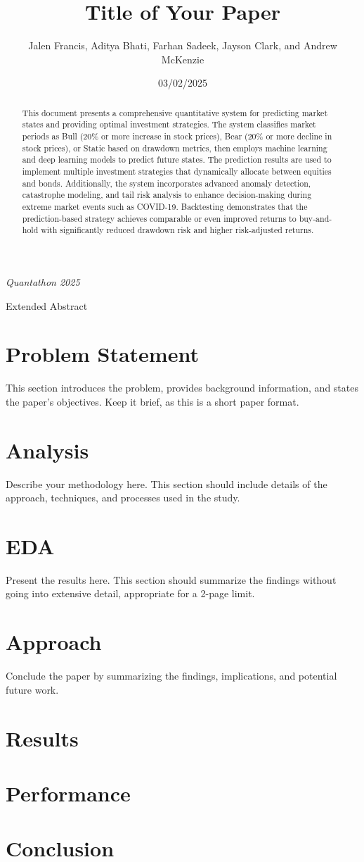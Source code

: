 \documentclass[10pt]{article}
\title{Title of Your Paper}
\author{Jalen Francis, Aditya Bhati, Farhan Sadeek, Jayson Clark, and Andrew McKenzie}
\date{03/02/2025}
\makeatletter
\renewcommand{\maketitle}{%
    \begin{center}
        \vspace*{0.5cm}
        \Large\@title
        
        \vspace{0.4cm}
        \large\@author
        
        \vspace{0.5cm}
        \normalsize\textit{Quantathon 2025}
        
        \vspace{0.3cm}
        \normalsize Extended Abstract
        \vspace{0.5cm}
    \end{center}
}
\makeatother
\begin{document}
\maketitle

\begin{abstract}

    This document presents a comprehensive quantitative system for predicting market states and providing optimal investment strategies. The system classifies market periods as Bull (20\% or more increase in stock prices), Bear (20\% or more decline in stock prices), or Static based on drawdown metrics, then employs machine learning and deep learning models to predict future states. The prediction results are used to implement multiple investment strategies that dynamically allocate between equities and bonds. Additionally, the system incorporates advanced anomaly detection, catastrophe modeling, and tail risk analysis to enhance decision-making during extreme market events such as COVID-19. Backtesting demonstrates that the prediction-based strategy achieves comparable or even improved returns to buy-and-hold with significantly reduced drawdown risk and higher risk-adjusted returns.

\end{abstract}

\section{Problem Statement}
This section introduces the problem, provides background information, and states the paper's objectives. Keep it brief, as this is a short paper format.

\section{Analysis}
Describe your methodology here. This section should include details of the approach, techniques, and processes used in the study.

\section{EDA}
Present the results here. This section should summarize the findings without going into extensive detail, appropriate for a 2-page limit.

\section{Approach}
Conclude the paper by summarizing the findings, implications, and potential future work.

\section{Results}

\section{Performance}

\section{Conclusion}



\end{document}
